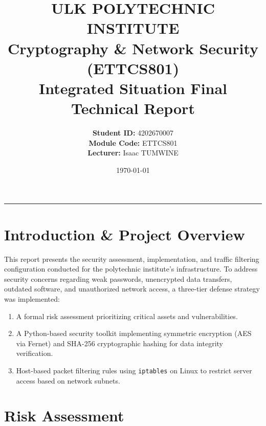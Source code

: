 \documentclass[11pt,a4paper]{article}
\title{\textbf{ULK POLYTECHNIC INSTITUTE}\\ \Large Cryptography \& Network Security (ETTCS801)\\ \large Integrated Situation Final Technical Report}
\author{\textbf{Student ID:} 4202670007 \\ \textbf{Module Code:} ETTCS801 \\ \textbf{Lecturer:} Isaac TUMWINE}
\date{\today}
\begin{document}
\maketitle

\hrule
\vspace{0.5cm}

\section{Introduction \& Project Overview}
This report presents the security assessment, implementation, and traffic filtering configuration conducted for the polytechnic institute's infrastructure. To address security concerns regarding weak passwords, unencrypted data transfers, outdated software, and unauthorized network access, a three-tier defense strategy was implemented:
\begin{enumerate}
    \item A formal risk assessment prioritizing critical assets and vulnerabilities.
    \item A Python-based security toolkit implementing symmetric encryption (AES via Fernet) and SHA-256 cryptographic hashing for data integrity verification.
    \item Host-based packet filtering rules using \texttt{iptables} on Linux to restrict server access based on network subnets.
\end{enumerate}


\section{Risk Assessment}
\end{document}
